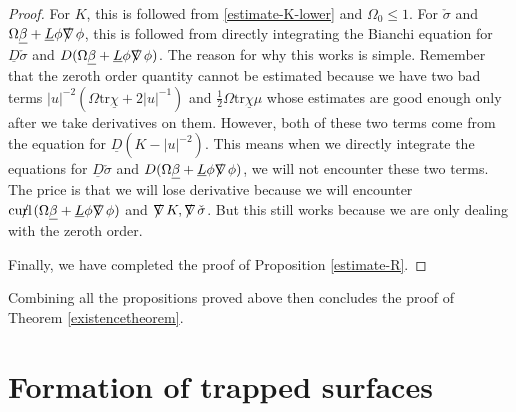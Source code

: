 \documentclass[11pt,reqno]{amsart}
\theoremstyle{definition}
\numberwithin{equation}{section}
\newcommand{\tr}{\mathrm{tr}}
\def\betab{\underline{\beta}}
\def\chib{\underline{\chi}}
\def\Lb{\underline{L}}
\def\tr{\mathrm{tr}}
\def\sigmac{\check{\sigma}}
\newcommand{\Db}{\underline{D}}
\def\nablas{\mbox{$\nabla \mkern -13mu /$ }}
\def\curls{\mbox{$\mathrm{curl} \mkern -13mu /$ }}
\begin{document}
\begin{proof}
For $K$, this is followed from \eqref{estimate-K-lower} and $\Omega_0\le1$. For $\sigmac$ and $\Omega\betab+\Lb\phi\nablas\phi$, this is followed from directly integrating the Bianchi equation for $\Db\sigmac$ and $D(\Omega\betab+\Lb\phi\nablas\phi)$. The reason for why this works is simple. Remember that the zeroth order quantity cannot be estimated because we have two bad terms $|u|^{-2}(\Omega\tr\chib+2|u|^{-1})$ and $\frac{1}{2}\Omega\tr\chib\mu$ whose estimates are good enough only after we take derivatives on them. However, both of these two terms come from the equation for $\Db(K-|u|^{-2})$. This means when we directly integrate the equations for $\Db\sigmac$ and $D(\Omega\betab+\Lb\phi\nablas\phi)$, we will not encounter these two terms. The price is that we will lose derivative because we will encounter $\curls(\Omega\betab+\Lb\phi\nablas\phi)$ and $\nablas K, \nablas\sigmac$. But this still works because we are only dealing with the zeroth order. 

Finally, we have completed the proof of Proposition \ref{estimate-R}.

\end{proof}

Combining all the propositions proved above then concludes the proof of Theorem \ref{existencetheorem}.

\section{Formation of trapped surfaces}\label{FoTS}
\end{document}
